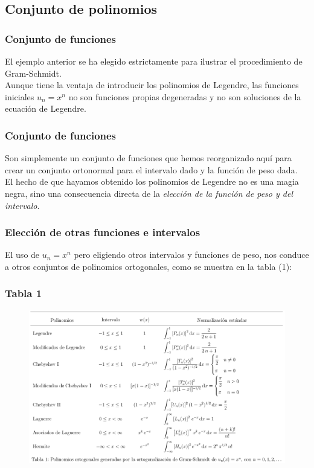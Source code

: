 \subsection{Conjunto de polinomios}
\begin{frame}
\frametitle{Conjunto de funciones}
El ejemplo anterior se ha elegido estrictamente para ilustrar el procedimiento de Gram-Schmidt.
\\
\bigskip
\pause
Aunque tiene la ventaja de introducir los polinomios de Legendre, las funciones iniciales $u_{n} = x^{n}$ no son funciones propias degeneradas y no son soluciones de la ecuación de Legendre.
\end{frame}
\begin{frame}
\frametitle{Conjunto de funciones}
Son simplemente un conjunto de funciones que hemos reorganizado aquí para crear un conjunto ortonormal para el intervalo dado y la función de peso dada. 
\\
\bigskip
El hecho de que hayamos obtenido los polinomios de Legendre no es una magia negra, sino una consecuencia directa de la \emph{elección de la función de peso y del intervalo}.
\end{frame}
\begin{frame}
\frametitle{Elección de otras funciones e intervalos}
El uso de $u_{n} = x^{n}$ pero eligiendo otros intervalos y funciones de peso, nos conduce a otros conjuntos de polinomios ortogonales, como se muestra en la tabla (1):
\end{frame}
\begin{frame}[plain]
\frametitle{Tabla 1}
\begin{figure}
   \centering
   \includegraphics[scale=0.36]{Imagenes/Tabla_01.png}
\end{figure}
\end{frame}
